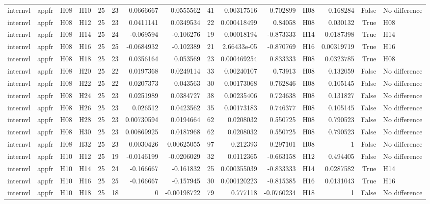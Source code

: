 \begin{longtable}{llllrrrrrrrlrrl}
internvl & appfr & H08 & H10 & 25 & 23 & 0.0666667 & 0.0555562 & 41 & 0.00317516 & 0.702899 & H08 & 0.168284 & False & No difference \\
internvl & appfr & H08 & H12 & 25 & 23 & 0.0411141 & 0.0349534 & 22 & 0.000418499 & 0.84058 & H08 & 0.030132 & True & H08 \\
internvl & appfr & H08 & H14 & 25 & 24 & -0.069594 & -0.106276 & 19 & 0.00018194 & -0.873333 & H14 & 0.0187398 & True & H14 \\
internvl & appfr & H08 & H16 & 25 & 25 & -0.0684932 & -0.102389 & 21 & 2.66433e-05 & -0.870769 & H16 & 0.00319719 & True & H16 \\
internvl & appfr & H08 & H18 & 25 & 23 & 0.0356164 & 0.053569 & 23 & 0.000469254 & 0.833333 & H08 & 0.0323785 & True & H08 \\
internvl & appfr & H08 & H20 & 25 & 22 & 0.0197368 & 0.0249114 & 33 & 0.00240107 & 0.73913 & H08 & 0.132059 & False & No difference \\
internvl & appfr & H08 & H22 & 25 & 22 & 0.0207373 & 0.043563 & 30 & 0.00173068 & 0.762846 & H08 & 0.105145 & False & No difference \\
internvl & appfr & H08 & H24 & 25 & 23 & 0.0251989 & 0.0384727 & 38 & 0.00235406 & 0.724638 & H08 & 0.131827 & False & No difference \\
internvl & appfr & H08 & H26 & 25 & 23 & 0.026512 & 0.0423562 & 35 & 0.00173183 & 0.746377 & H08 & 0.105145 & False & No difference \\
internvl & appfr & H08 & H28 & 25 & 23 & 0.00730594 & 0.0194664 & 62 & 0.0208032 & 0.550725 & H08 & 0.790523 & False & No difference \\
internvl & appfr & H08 & H30 & 25 & 23 & 0.00869925 & 0.0187968 & 62 & 0.0208032 & 0.550725 & H08 & 0.790523 & False & No difference \\
internvl & appfr & H08 & H32 & 25 & 23 & 0.0030426 & 0.00625055 & 97 & 0.212393 & 0.297101 & H08 & 1 & False & No difference \\
internvl & appfr & H10 & H12 & 25 & 19 & -0.0146199 & -0.0206029 & 32 & 0.0112365 & -0.663158 & H12 & 0.494405 & False & No difference \\
internvl & appfr & H10 & H14 & 25 & 24 & -0.166667 & -0.161832 & 25 & 0.000355039 & -0.833333 & H14 & 0.0287582 & True & H14 \\
internvl & appfr & H10 & H16 & 25 & 25 & -0.166667 & -0.157945 & 30 & 0.000120223 & -0.815385 & H16 & 0.0131043 & True & H16 \\
internvl & appfr & H10 & H18 & 25 & 18 & 0 & -0.00198722 & 79 & 0.777118 & -0.0760234 & H18 & 1 & False & No difference \\

\end{longtable}

